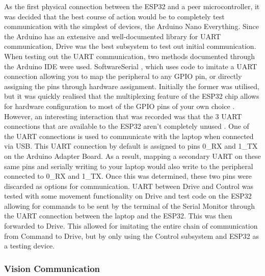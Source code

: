 \documentclass[a4paper]{article}
\begin{document}
As the first physical connection between the ESP32 and a peer 
microcontroller, it was decided that the best course of action would 
be to completely test communication with the simplest of devices, 
the Arduino Nano Everything. Since the Arduino has an extensive 
and well-documented library for UART communication, Drive was the 
best subsystem to test out initial communication. When testing out the 
UART communication, two methods documented through the Arduino IDE were used. 
SoftwareSerial \cite{ESPSoftwareSerial}, which uses code to imitate a 
UART connection allowing you to map the peripheral to any GPIO pin, 
or directly assigning the pins through hardware assignment. 
Initially the former was utilised, but it was quickly realised that the 
multiplexing feature of the ESP32 chip allows for hardware configuration 
to most of the GPIO pins of your own choice \cite{ESP32PinOut}. However, 
an interesting interaction that was recorded was that the 3 UART connections 
that are available to the ESP32 aren’t completely unused \cite{ESPHardwareUART}. 
One of the UART connections is used to communicate with the laptop when 
connected via USB. This UART connection by default is assigned to pins 
0\_RX and 1\_TX on the Arduino Adapter Board. As a result, 
mapping a secondary UART on these same pins and serially writing 
to your laptop would also write to the peripheral connected to 
0\_RX and 1\_TX. Once this was determined, these two pins were 
discarded as options for communication. UART between Drive and Control 
was tested with some movement functionality on Drive and test code on the 
ESP32 allowing for commands to be sent by the terminal of the 
Serial Monitor through the UART connection between the laptop and the 
ESP32. This was then forwarded to Drive. This allowed for imitating the 
entire chain of communication from Command to Drive, but by only using the 
Control subsystem and ESP32 as a testing device.

\subsubsection{Vision Communication}
\end{document}
